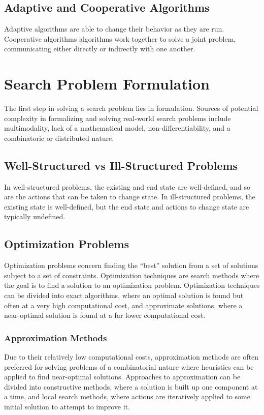 \documentclass[12pt,titlepage]{article}
\let\stdsection\section
\renewcommand\section{\clearpage\stdsection}
\begin{document}
    \subsection{Adaptive and Cooperative Algorithms}
      Adaptive algorithms are able to change their behavior as they are run. Cooperative algorithms algorithms work
      together to solve a joint problem, communicating either directly or indirectly with one another.

  \section{Search Problem Formulation}
    The first step in solving a search problem lies in formulation. Sources of potential complexity in formalizing and
    solving real-world search problems include multimodality, lack of a mathematical model, non-differentiability, and
    a combinatoric or distributed nature.

    \subsection{Well-Structured vs Ill-Structured Problems}
      In well-structured problems, the existing and end state are well-defined, and so are the actions that can be taken
      to change state. In ill-structured problems, the existing state is well-defined, but the end state and actions to
      change state are typically undefined.

    \subsection{Optimization Problems}
      Optimization problems concern finding the ``best'' solution from a set of solutions subject to a set of constraints.
      Optimization techniques are search methods where the goal is to find a solution to an optimization problem. Optimization
      techniques can be divided into exact algorithms, where an optimal solution is found but often at a very high computational
      cost, and approximate solutions, where a near-optimal solution is found at a far lower computational cost.

      \subsubsection{Approximation Methods}
        Due to their relatively low computational costs, approximation methods are often preferred for solving problems of a
        combinatorial nature where heuristics can be applied to find near-optimal solutions. Approaches to approximation can
        be divided into constructive methods, where a solution is built up one component at a time, and local search methods,
        where actions are iteratively applied to some initial solution to attempt to improve it.
\end{document}
